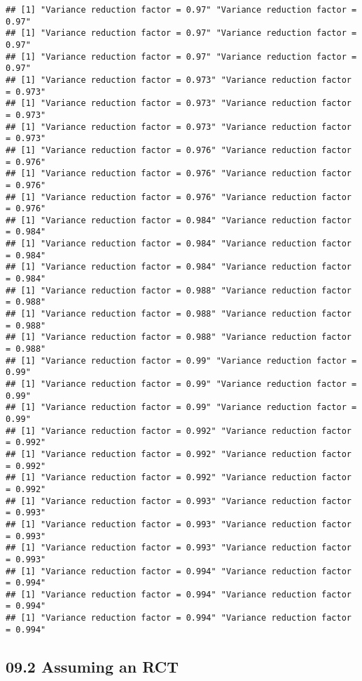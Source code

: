 \documentclass[
]{article}
\begin{document}
\begin{verbatim}
## [1] "Variance reduction factor = 0.97" "Variance reduction factor = 0.97"
## [1] "Variance reduction factor = 0.97" "Variance reduction factor = 0.97"
## [1] "Variance reduction factor = 0.97" "Variance reduction factor = 0.97"
## [1] "Variance reduction factor = 0.973" "Variance reduction factor = 0.973"
## [1] "Variance reduction factor = 0.973" "Variance reduction factor = 0.973"
## [1] "Variance reduction factor = 0.973" "Variance reduction factor = 0.973"
## [1] "Variance reduction factor = 0.976" "Variance reduction factor = 0.976"
## [1] "Variance reduction factor = 0.976" "Variance reduction factor = 0.976"
## [1] "Variance reduction factor = 0.976" "Variance reduction factor = 0.976"
## [1] "Variance reduction factor = 0.984" "Variance reduction factor = 0.984"
## [1] "Variance reduction factor = 0.984" "Variance reduction factor = 0.984"
## [1] "Variance reduction factor = 0.984" "Variance reduction factor = 0.984"
## [1] "Variance reduction factor = 0.988" "Variance reduction factor = 0.988"
## [1] "Variance reduction factor = 0.988" "Variance reduction factor = 0.988"
## [1] "Variance reduction factor = 0.988" "Variance reduction factor = 0.988"
## [1] "Variance reduction factor = 0.99" "Variance reduction factor = 0.99"
## [1] "Variance reduction factor = 0.99" "Variance reduction factor = 0.99"
## [1] "Variance reduction factor = 0.99" "Variance reduction factor = 0.99"
## [1] "Variance reduction factor = 0.992" "Variance reduction factor = 0.992"
## [1] "Variance reduction factor = 0.992" "Variance reduction factor = 0.992"
## [1] "Variance reduction factor = 0.992" "Variance reduction factor = 0.992"
## [1] "Variance reduction factor = 0.993" "Variance reduction factor = 0.993"
## [1] "Variance reduction factor = 0.993" "Variance reduction factor = 0.993"
## [1] "Variance reduction factor = 0.993" "Variance reduction factor = 0.993"
## [1] "Variance reduction factor = 0.994" "Variance reduction factor = 0.994"
## [1] "Variance reduction factor = 0.994" "Variance reduction factor = 0.994"
## [1] "Variance reduction factor = 0.994" "Variance reduction factor = 0.994"
\end{verbatim}

\hypertarget{assuming-an-rct}{%
\subsection{09.2 Assuming an RCT}\label{assuming-an-rct}}
\end{document}
